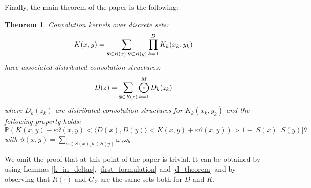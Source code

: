 \documentclass[twoside,11pt]{article}
\newtheorem{theorem}{Theorem}
\def\substr#1{{\bf\overline{#1}}}
\def\P{\mathbb{P}}
\def\dotprod#1#2{\langle#1,#2\rangle}
\def\J{\vartheta}
\def\Mo{\bigodot}
\def\comment#1#2{}
\def\finalcomment#1#2{}
\def\finalsecondcomment#1#2{}
\begin{document}
\comment{[R2,C2]}{Section 3.2: the material in this section seems to offer an explanation of the fact that the performance 
of the DSTK and DRTK performance drops more than the DTK when lambda increases, and it is 
incomprehensible that the authors do not build the link (actually, this section would be better at the end 
of the paper). Why not add the omega weights in equation (5). Then instead of |S(T)| one would use the 
sum of the omegas, which drops much faster when lambda is small. Is there something I am missing 
here?}

Finally, the main theorem of the paper is the following: 
\finalcomment{Theorem 10: as for Lemma 8 above}{R1.7}
\finalsecondcomment{R3.11}{Theorem 10: are there some delta's missing in the last equation?}
\begin{theorem}
\label{The_theorem_of_the_paper}
Convolution kernels over discrete sets:
\begin{displaymath}
K(x,y) = \displaystyle\sum_{\substr{x} \in R(x), \substr{y} \in R(y)} \displaystyle\prod_{k=1}^D K_k(x_k,y_k)
\end{displaymath}
have associated distributed convolution structures:
\begin{displaymath}
D(z) = \displaystyle\sum_{\substr{z} \in R(z)} \displaystyle\Mo_{k=1}^M D_k(z_k)
\end{displaymath}
where $D_k(z_k)$ are distributed convolution structures for $K_k(x_k,y_k)$ and the following property holds:\\
\begin{displaymath}
\P(K(x,y)  - \varepsilon \J(x,y)<\dotprod{D(x)}{D(y)} < K(x,y) + \varepsilon \J(x,y)) > 1-|S(x)||S(y)|\theta
\end{displaymath}
with $\J(x,y)=\displaystyle\sum_{a \in S(x), b \in S(y)} \omega_a\omega_b$
\end{theorem}
We omit the proof that at this point of the paper is trivial. It can be obtained by using Lemmas \ref{k_in_deltas}, \ref{first_formulation} and \ref{d_theorem} and by observing that $R(\cdot)$ and $G_Z$ are the same sets both for $D$ and $K$.
\end{document}
